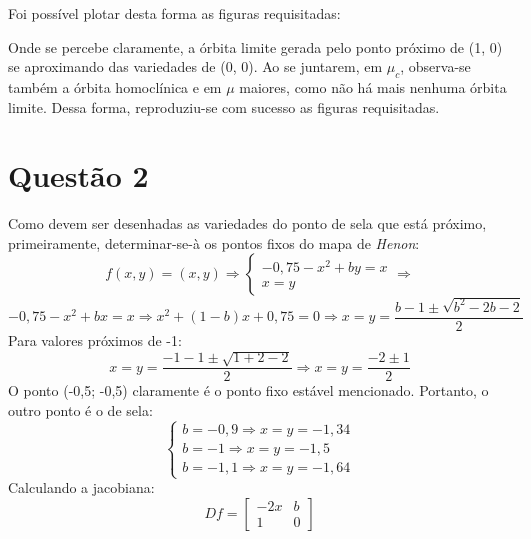 \documentclass{article}[twocolumn]
\begin{document}
	Foi poss\'ivel plotar desta forma as figuras requisitadas:
	\begin{figure}[H]
		\centering
	\end{figure}
	Onde se percebe claramente, a \'orbita limite gerada pelo ponto pr\'oximo de (1, 0) se
	aproximando das variedades de (0, 0). Ao se juntarem, em $\mu_c$, observa-se tamb\'em
	a \'orbita homocl\'inica e em $\mu$ maiores, como n\~ao h\'a mais nenhuma \'orbita limite.
	Dessa forma, reproduziu-se com sucesso as figuras requisitadas.
	\section{Quest\~ao 2}
	Como devem ser desenhadas as variedades do ponto de sela que est\'a pr\'oximo,
	primeiramente, determinar-se-\`a os pontos fixos do mapa de \textit{Henon}:
	\begin{equation}
		f(x, y) = (x, y) \Rightarrow \left\{\begin{array}{l}
			-0,75 - x^2 + by = x\\x = y
		\end{array}\right. \Rightarrow
		\nonumber
	\end{equation}
	\begin{equation}
		-0,75 - x^2 + bx = x \Rightarrow x^2 + (1 - b)x + 0,75 = 0 \Rightarrow
		x = y = \frac{b - 1 \pm \sqrt{b^2 - 2b - 2}}{2}
		\nonumber
	\end{equation}
	Para valores pr\'oximos de -1:
	\begin{equation}
		x = y = \frac{-1 - 1 \pm \sqrt{1 + 2 - 2}}{2} \Rightarrow
		x = y = \frac{-2 \pm 1}{2}
		\nonumber
	\end{equation}
	O ponto (-0,5; -0,5) claramente \'e o ponto fixo est\'avel mencionado. Portanto, o
	outro ponto \'e o de sela:
	\begin{equation}
		\left\{\begin{array}{l}
			b = -0,9 \Rightarrow x = y = -1,34\\
			b = -1 \Rightarrow x = y = -1,5\\
			b = -1,1 \Rightarrow x = y = -1,64
		\end{array}\right.
	\end{equation}
	Calculando a jacobiana:
	\begin{equation}
		Df = \left[\begin{array}{cc}
			-2x & b\\
			1 & 0
		\end{array}\right]
		\nonumber
	\end{equation}
\end{document}
